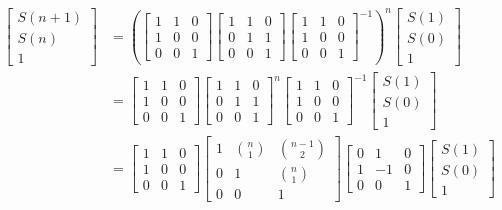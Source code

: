 \begin{align}
\begin{bmatrix} S(n+1) \\ S(n) \\ 1\end{bmatrix} &=
\left(\begin{bmatrix} 1 & 1 & 0 \\ 1 & 0 & 0 \\ 0 & 0 & 1\end{bmatrix}
\begin{bmatrix} 1 & 1 & 0 \\ 0 & 1 & 1 \\ 0 & 0 & 1\end{bmatrix}
\begin{bmatrix} 1 & 1 & 0 \\ 1 & 0 & 0 \\ 0 & 0 & 1\end{bmatrix}^{-1}\right)^n
\begin{bmatrix} S(1) \\ S(0) \\ 1\end{bmatrix}
\\ &=
\begin{bmatrix} 1 & 1 & 0 \\ 1 & 0 & 0 \\ 0 & 0 & 1\end{bmatrix}
\begin{bmatrix} 1 & 1 & 0 \\ 0 & 1 & 1 \\ 0 & 0 & 1\end{bmatrix}^n
\begin{bmatrix} 1 & 1 & 0 \\ 1 & 0 & 0 \\ 0 & 0 & 1\end{bmatrix}^{-1}
\begin{bmatrix} S(1) \\ S(0) \\ 1\end{bmatrix}
\\ &=
\begin{bmatrix} 1 & 1 & 0 \\ 1 & 0 & 0 \\ 0 & 0 & 1\end{bmatrix}
\begin{bmatrix} 1 & \binom{n}{1} & \binom{n-1}{2} \\ 0 & 1 & \binom{n}{1} \\ 0 & 0 & 1\end{bmatrix}
\begin{bmatrix} 0 & 1 & 0 \\ 1 & -1 & 0 \\ 0 & 0 & 1\end{bmatrix}
\begin{bmatrix} S(1) \\ S(0) \\ 1\end{bmatrix}
\end{align}
